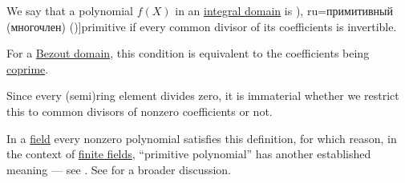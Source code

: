 \begin{definition}\label{def:domain_primitive_polynomial}
  We say that a polynomial \( f(X) \) in an \hyperref[def:integral_domain]{integral domain} is \term[bg=примитивен (полином) (\cite[43]{ГеновМиховскиМоллов1991Алгебра}), ru=примитивный (многочлен) (\cite[124]{Винберг2014Алгебра})]{primitive} if every common divisor of its coefficients is invertible.
\end{definition}
\begin{comments}
  \item For a \hyperref[def:bezout_domain]{Bezout domain}, this condition is equivalent to the coefficients being \hyperref[def:coprime_elements]{coprime}.

  \item Since every (semi)ring element divides zero, it is immaterial whether we restrict this to common divisors of nonzero coefficients or not.

  \item In a \hyperref[def:field]{field} every nonzero polynomial satisfies this definition, for which reason, in the context of \hyperref[def:finite_field]{finite fields}, \enquote{primitive polynomial} has another established meaning --- see . See  for a broader discussion.
\end{comments}

